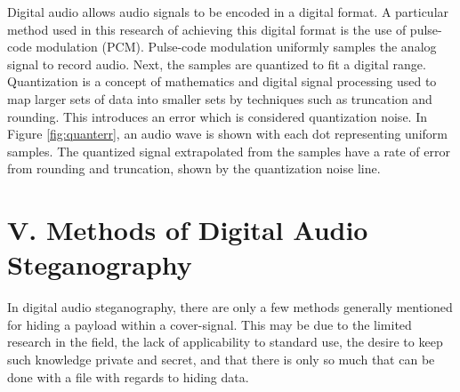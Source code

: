 \documentclass[letterpaper]{article}
\begin{document}
Digital audio allows audio signals to be encoded in a digital format. A particular method used in this research of achieving this digital format is the use of pulse-code modulation (PCM). Pulse-code modulation  uniformly samples the analog signal to record audio. Next, the samples are quantized to fit a digital range. Quantization is a concept of mathematics and digital signal processing used to map larger sets of data into smaller sets by techniques such as truncation and rounding. This introduces an error which is considered quantization noise. In Figure \ref{fig:quanterr}, an audio wave is shown with each dot representing uniform samples. The quantized signal extrapolated from the samples have a rate of error from rounding and truncation, shown by the quantization noise line. \cite{quantpic}  


\section{V. Methods of Digital Audio Steganography}
In digital audio steganography, there are only a few methods generally mentioned for hiding a payload within a cover-signal. This may be due to the limited research in the field, the lack of applicability to standard use, the desire to keep such knowledge private and secret, and that there is only so much that can be done with a file with regards to hiding data. 
\end{document}
